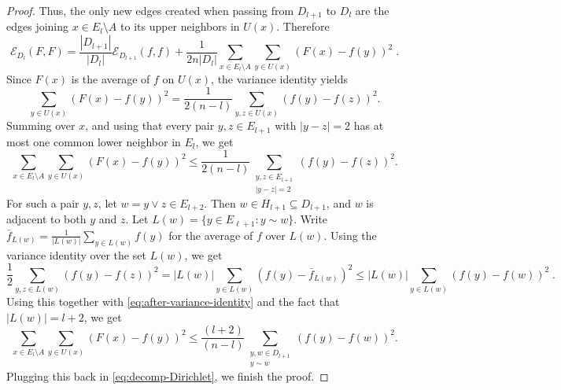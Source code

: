 \documentclass[12pt,final]{amsart}
\newcommand{\1}{\mathbf{1}}
\newcommand{\Ecal}{\mathcal{E}}
\begin{document}
\begin{proof}
Thus, the only new edges created when passing from $D_{l+1}$ to $D_l$ are the edges joining $x\in E_l\setminus A$ to its upper neighbors in $U(x)$. Therefore 
\begin{equation}
\label{eq:decomp-Dirichlet}
    \Ecal_{D_{l}}(F, F) = \frac{|D_{l+1}|}{|D_{l}|}\Ecal_{D_{l+1}}(f, f) + \frac{1}{2n|D_{l}|}\sum_{x\in E_l\setminus A}\sum_{y\in U(x)}(F(x)-f(y))^2\;.
\end{equation}
Since $F(x)$ is the average of $f$ on $U(x)$, the variance identity yields 
$$
    \sum_{y\in U(x)}(F(x)-f(y))^2= \frac{1}{2(n-l)} \sum_{y,z\in U(x)} (f(y)-f(z))^2. 
$$
Summing over $x$, and using that every pair $y,z\in E_{l+1}$ with $|y-z|=2$ has at most one common lower neighbor in $E_l$, we get 
\begin{equation}\label{eq:after-variance-identity}
  \sum_{x\in E_l\setminus A}\sum_{y\in U(x)}(F(x)-f(y))^2\leq \frac{1}{2(n-l)} \sum_{\substack{y,z\in E_{l+1}\\ |y-z|=2}}  (f(y)-f(z))^2.
\end{equation}
For such a pair $y,z$, let $w=y\vee z\in E_{l+2}$. Then $w\in H_{l+1}\subseteq D_{l+1}$, and $w$ is adjacent to both $y$ and $z$. Let $L(w)=\{y\in E_{\ell+1}: y\sim w\}$. Write $\bar{f}_{L(w)}=\frac{1}{|L(w)|}\sum_{y\in L(w)}f(y)$ for the average of $f$ over $L(w)$. Using the variance identity over the set $L(w)$, we get 
\[
\frac{1}{2}\sum_{y, z\in L(w)}(f(y)-f(z))^2 = |L(w)|\sum_{y\in L(w)}(f(y)-\bar{f}_{L(w)})^2\leq |L(w)|\sum_{y\in L(w)}(f(y)-f(w))^2\;.
\]
Using this together with \eqref{eq:after-variance-identity} and the fact that $|L(w)|=l+2$, we get 
$$
\sum_{x\in E_l\setminus A}\sum_{y\in U(x)}(F(x)-f(y))^2\leq \frac{(l+2)}{(n-l)} \sum_{\substack{y,w\in D_{l+1}\\ y\sim w}}  (f(y)-f(w))^2.
$$
Plugging this back in \eqref{eq:decomp-Dirichlet}, we finish the proof. 
\end{proof}
\end{document}
